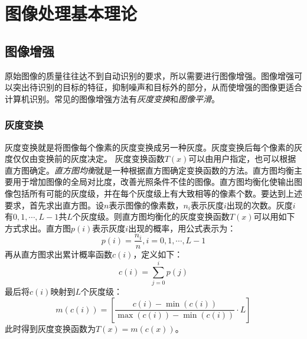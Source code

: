 
\chapter{图像处理基本理论}

\section{图像增强}

原始图像的质量往往达不到自动识别的要求，所以需要进行图像增强。图像增强可以突出待识别的目标的特征，抑制噪声和目标外的部分，从而使增强的图像更适合计算机识别。常见的图像增强方法有\emph{灰度变换}和\emph{图像平滑}。%

\subsection{灰度变换}

灰度变换就是将图像每个像素的灰度变换成另一种灰度。灰度变换后每个像素的灰度仅仅由变换前的灰度决定。%
灰度变换函数$T(x)$可以由用户指定，也可以根据直方图确定。\emph{直方图均衡}就是一种根据直方图确定变换函数的方法。直方图均衡主要用于增加图像的全局对比度，改善光照条件不佳的图像。直方图均衡化使输出图像包括所有可能的灰度级，并在每个灰度级上有大致相等的像素个数。要达到上述要求，首先求出直方图。设$n$表示图像的像素数，$n_i$表示灰度$i$出现的次数。灰度$i$有$0,1,\cdots,L-1$共$L$个灰度级。则直方图均衡化的灰度变换函数$T(x)$可以用如下方式求出。直方图$p(i)$表示灰度$i$出现的概率，用公式表示为：%
\begin{equation}
  \label{eq:hist}
  p(i)=\frac{n_i}{n},i=0,1,\cdots,L-1
\end{equation}
再从直方图求出累计概率函数$c(i)$，定义如下：
\begin{equation}
  \label{eq:acc}
  c(i)=\sum_{j=0}^i p(j)
\end{equation}
最后将$c(i)$映射到$L$个灰度级：
\begin{equation}
  \label{eq:map}
  m(c(i))=\left[\frac{c(i)-\min(c(i))}{\max(c(i))-\min(c(i))}\cdot L\right]
\end{equation}
此时得到灰度变换函数为$T(x)=m(c(x))$。

